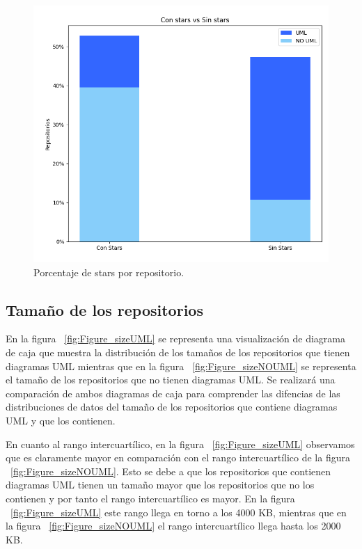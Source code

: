 \documentclass[a4paper, 12pt]{book}
\begin{document}
\begin{figure}
  \centering
  \includegraphics[width=12cm, keepaspectratio]{img/Figure_stars.png}
  \caption{Porcentaje de stars por repositorio.}\label{fig:Figure_stars}
\end{figure}


\subsection{Tamaño de los repositorios}
\label{sec:Diagrama de caja del tamaño de los repositorios}
En la figura ~\ref{fig:Figure_sizeUML} se representa una visualización de diagrama de caja que muestra la distribución de los tamaños de los repositorios que tienen diagramas UML 
mientras que en la figura ~\ref{fig:Figure_sizeNOUML} se representa el tamaño de los repositorios que no tienen diagramas UML.
Se realizará una comparación de ambos diagramas de caja para comprender las difencias de las distribuciones de datos del tamaño de los repositorios que contiene diagramas UML y que los contienen.
 

En cuanto al rango intercuartílico, en la figura ~\ref{fig:Figure_sizeUML} observamos que es claramente mayor en comparación con el rango intercuartílico de la figura ~\ref{fig:Figure_sizeNOUML}.
Esto se debe a que los repositorios que contienen diagramas UML tienen un tamaño mayor que los repositorios que no los contienen y por tanto el rango intercuartílico es mayor.
En la figura ~\ref{fig:Figure_sizeUML} este rango llega en torno a los 4000 KB, mientras que en la figura ~\ref{fig:Figure_sizeNOUML} el rango intercuartílico llega hasta los 2000 KB.
\end{document}
